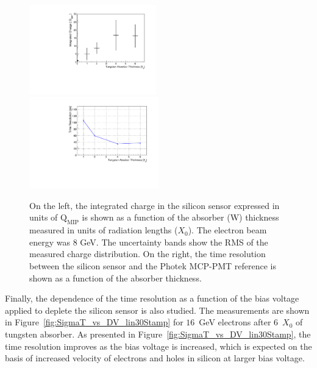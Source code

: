 \begin{figure}[h] 
\centering
\includegraphics[width=0.49\textwidth]{plots/MIPVsAbsorberAt8GeV.pdf} 
\includegraphics[width=0.5\textwidth]{plots/SigmaT_vs_X0_lin30Stamp.pdf} 
\caption{On the left, the integrated charge in the silicon sensor expressed in
units of $\mathrm{Q}_{\mathrm{MIP}}$ is shown as a function of the absorber (W)
thickness measured in units of radiation lengths ($X_{0}$). The electron beam
energy was 8 GeV. The uncertainty bands show the RMS of the measured charge
distribution. On the right, the time resolution between the silicon sensor and
the Photek MCP-PMT reference is shown as a function of the absorber thickness. } 
\label{fig:MIPVsAbsorberAt8GeV} 
\end{figure} 
Finally, the dependence of the time resolution as a function of the
bias voltage applied to deplete the silicon sensor is also studied. The measurements are shown
in Figure~\ref{fig:SigmaT_vs_DV_lin30Stamp} for $16$~GeV electrons after
6~$X_0$ of tungsten absorber. As presented in
Figure~\ref{fig:SigmaT_vs_DV_lin30Stamp}, the time resolution
improves as the bias voltage is increased, which is expected on the basis of 
increased velocity of electrons and holes in silicon at larger bias voltage. 
